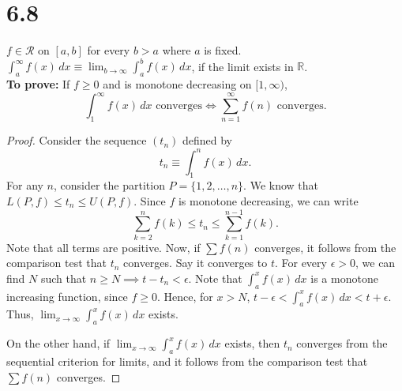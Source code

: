 \documentclass[12pt]{article}
\begin{document}
\section{6.8}

$f\in\mathscr R$ on $[a, b]$ for every $b>a$ where $a$ is fixed.\\
$\int_{a}^{\infty}f(x)  \, dx\equiv \lim_{ b \to \infty }\int_{a}^{b} f(x) \, dx$, if the limit exists in $\mathbb{R}$.\\


{\bf To prove: }If $f\geq 0$ and is monotone decreasing on $[1, \infty)$, 
$$
\int_{1}^{\infty}f(x)  \, dx \text{ converges} \iff \sum_{n=1}^{\infty}f(n) \text{ converges}.
$$


\begin{proof}

Consider the sequence $(t_{n})$ defined by
$$
t_{n}\equiv \int_{1}^{n} f(x) \, dx.
$$
For any $n$, consider the partition $P=\{ 1, 2, \dots, n \}$. We know that $L(P, f)\leq t_{n}\leq U(P, f)$. Since $f$ is monotone decreasing, we can write
$$
\sum_{k=2}^{n} f(k) \leq t_{n}\leq \sum_{k=1}^{n-1} f(k).
$$
Note that all terms are positive. Now, if $\sum f(n)$ converges, it follows from the comparison test that $t_{n}$ converges. Say it converges to $t$. For every $\epsilon>0$, we can find $N$ such that $n\geq N\implies t-t_{n}<\epsilon$. Note that $\int_{a}^{x} f(x) \, dx$ is a monotone increasing function, since $f\geq 0$. Hence, for $x>N$, $t-\epsilon<\int_{a}^{x} f(x) \, dx<t+\epsilon$. Thus, $\lim_{ x \to \infty }\int_{a}^{x} f(x) \, dx$ exists. 

On the other hand, if $\lim_{ x \to \infty }\int_{a}^{x} f(x) \, dx$ exists, then $t_{n}$ converges from the sequential criterion for limits, and it follows from the comparison test that $\sum f(n)$ converges. 
\end{proof}
\end{document}
